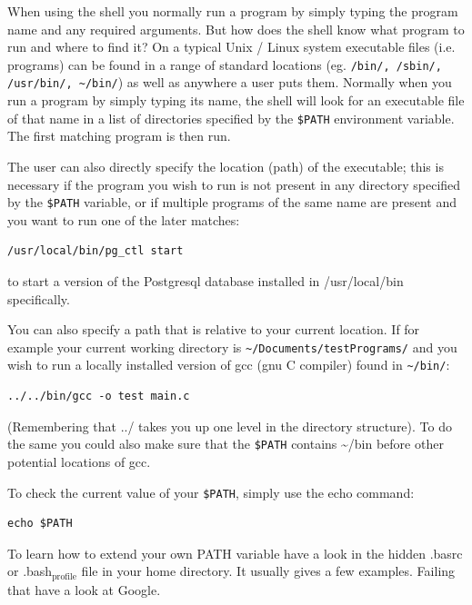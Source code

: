 \documentclass[11pt]{article}
\begin{document}
When using the shell you normally run a program by simply typing the
program name and any required arguments. But how does the shell know
what program to run and where to find it? On a typical Unix / Linux
system executable files (i.e. programs) can be found in a range of
standard locations (eg. \texttt{/bin/, /sbin/, /usr/bin/, \textasciitilde{}/bin/}) as well as
anywhere a user puts them. Normally when you run a program by simply
typing its name, the shell will look for an executable file of that name
in a list of directories specified by the \texttt{\$PATH} environment variable.
The first matching program is then run.

The user can also directly specify the location (path) of the
executable; this is necessary if the program you wish to run is not
present in any directory specified by the \texttt{\$PATH} variable, or if
multiple programs of the same name are present and you want to run one
of the later matches:


\begin{verbatim}
/usr/local/bin/pg_ctl start
\end{verbatim}

to start a version of the Postgresql database installed in
/usr/local/bin specifically.

You can also specify a path that is relative to your current location.
If for example your current working directory is
\texttt{\textasciitilde{}/Documents/testPrograms/} and you wish to run a locally installed
version of gcc (gnu C compiler) found in \texttt{\textasciitilde{}/bin/}:


\begin{verbatim}
../../bin/gcc -o test main.c
\end{verbatim}

(Remembering that ../ takes you up one level in the directory
structure). To do the same you could also make sure that the \texttt{\$PATH}
contains \~{}/bin before other potential locations of gcc.

To check the current value of your \texttt{\$PATH}, simply use the echo command:


\begin{verbatim}
echo $PATH
\end{verbatim}


To learn how to extend your own PATH variable have a look in the hidden
.basrc or .bash$_{\mathrm{profile}}$ file in your home directory. It usually gives a
few examples. Failing that have a look at Google.
\end{document}
